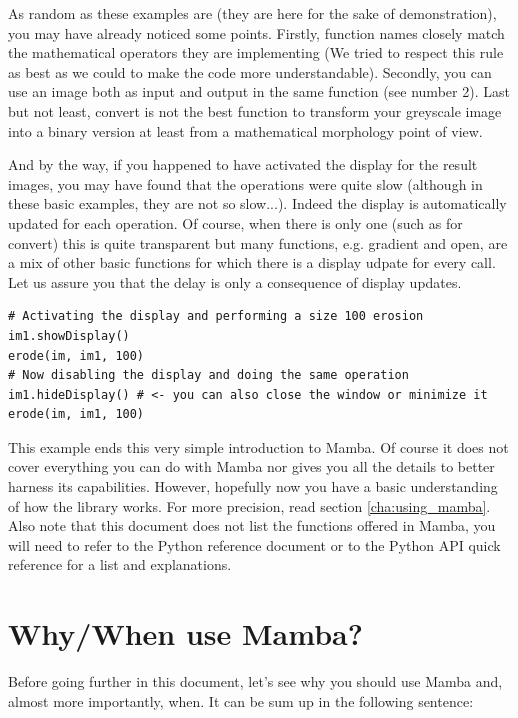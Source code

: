 \documentclass[a4paper,10pt,oneside]{article}
\begin{document}
As random as these examples are (they are here for the sake of demonstration),
you may have already noticed some points. Firstly, function names closely
match the mathematical operators they are implementing (We tried to respect this
rule as best as we could to make the code more understandable). Secondly, you can
use an image both as input and output in the same function (see number 2). Last
but not least, convert is not the best function to transform your greyscale image into
a binary version at least from a mathematical morphology point of view.

And by the way, if you happened to have activated the display for the result
images, you may have found that the operations were quite slow (although in these 
basic examples, they are not so slow...). Indeed the 
display is automatically updated for each operation. Of course, when there is
only one (such as for convert) this is quite transparent but many functions, 
e.g. gradient and open, are a mix of other basic functions for which there is
a display udpate for every call. Let us assure you that the delay is only a
consequence of display updates.

\lstset{language=Python}
\begin{lstlisting}
# Activating the display and performing a size 100 erosion
im1.showDisplay()
erode(im, im1, 100)
# Now disabling the display and doing the same operation
im1.hideDisplay() # <- you can also close the window or minimize it
erode(im, im1, 100)
\end{lstlisting}

This example ends this very simple introduction to Mamba. Of course it does not
cover everything you can do with Mamba nor gives you all the details to better
harness its capabilities. However, hopefully now you have a basic understanding 
of how the library works. For more precision, read section \ref{cha:using_mamba}.
Also note that this document does not list the functions offered in Mamba, you
will need to refer to the Python reference document or to the Python API
quick reference for a list and explanations.

\pagebreak

\section{Why/When use Mamba?}

Before going further in this document, let's see why you should use Mamba and, 
almost more importantly, when. It can be sum up in the following sentence:
\end{document}
